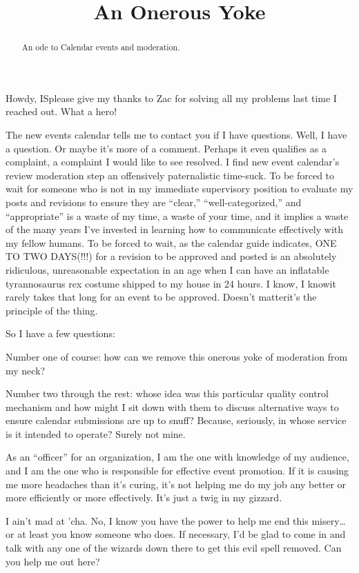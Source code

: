 \documentclass[12pt, letterpaper, final]{article}
\title{An Onerous Yoke}
\author{}
\date{}
\begin{document}
\maketitle
\vspace{-1in}

\begin{abstract}
    \begin{center}
        An ode to Calendar events and moderation.
    \end{center}
\end{abstract}

Howdy, IS\textemdash please give my thanks to Zac for solving all my problems last time I reached out.
What a hero!

The new events calendar tells me to contact you if I have questions.
Well, I have a question.
Or maybe it's more of a comment.
Perhaps it even qualifies as a complaint, a complaint I would like to see resolved.
I find new event calendar's review moderation step an offensively paternalistic time-suck.
To be forced to wait for someone who is not in my immediate supervisory position to evaluate my posts and revisions to ensure they are “clear,” “well-categorized,” and “appropriate” is a waste of my time, a waste of your time, and it implies a waste of the many years I've invested in learning how to communicate effectively with my fellow humans.
To be forced to wait, as the calendar guide indicates, {\large ONE TO TWO DAYS(!!!)} for a revision to be approved and posted is an absolutely ridiculous, unreasonable expectation in an age when I can have an inflatable tyrannosaurus rex costume shipped to my house in 24 hours.
I know, I know\textemdash it rarely takes that long for an event to be approved.
Doesn't matter\textemdash it's the principle of the thing.

So I have a few questions:

Number one of course: how can we remove this {\Huge onerous yoke} of moderation from my neck?

Number two through the rest: whose idea was this particular quality control mechanism and how might I sit down with them to discuss alternative ways to ensure calendar submissions are up to snuff?
Because, seriously, in whose service is it intended to operate? Surely not mine.

As an “officer” for an organization, I am the one with knowledge of my audience, and I am the one who is responsible for effective event promotion.
If it is causing me more headaches than it's curing, it's not helping me do my job any better or more efficiently or more effectively.
It's just a twig in my gizzard.

I ain't mad at 'cha.
No, I know you have the power to help me end this misery\ldots or at least you know someone who does.
If necessary, I'd be glad to come in and talk with any one of the wizards down there to get this evil spell removed.
Can you help me out here?
\end{document}
